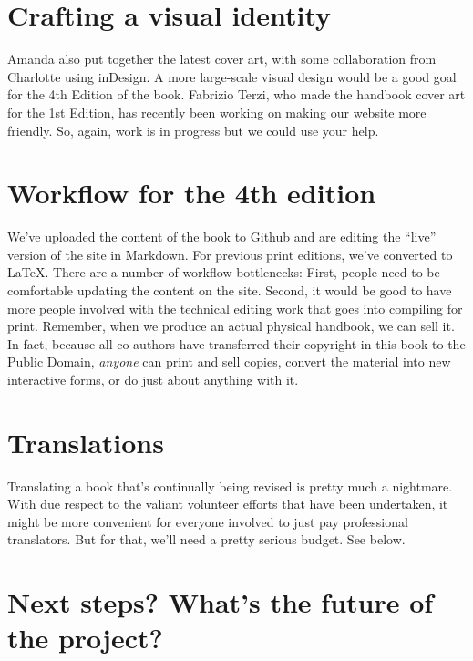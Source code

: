 \section*{Crafting a visual identity}\label{crafting-a-visual-identity}

Amanda also put together the latest cover art, with some collaboration
from Charlotte using inDesign. A more large-scale visual design would be
a good goal for the 4th Edition of the book. Fabrizio Terzi, who made
the handbook cover art for the 1st Edition, has recently been working on
making our website more friendly. So, again, work is in progress but we
could use your help.

\section*{Workflow for the 4th
edition}\label{workflow-for-the-4th-edition}

We've uploaded the content of the book to Github and are editing the
``live'' version of the site in Markdown. For previous print editions,
we've converted to LaTeX. There are a number of workflow bottlenecks:
First, people need to be comfortable updating the content on the site.
Second, it would be good to have more people involved with the technical
editing work that goes into compiling for print. Remember, when we
produce an actual physical handbook, we can sell it. In fact, because
all co-authors have transferred their copyright in this book to the
Public Domain, \emph{anyone} can print and sell copies, convert the
material into new interactive forms, or do just about anything with it.

\section*{Translations}\label{translations}

Translating a book that's continually being revised is pretty much a
nightmare. With due respect to the valiant volunteer efforts that have
been undertaken, it might be more convenient for everyone involved to
just pay professional translators. But for that, we'll need a pretty
serious budget. See below.

\section*{Next steps? What's the future of the
project?}\label{next-steps-whats-the-future-of-the-project}

